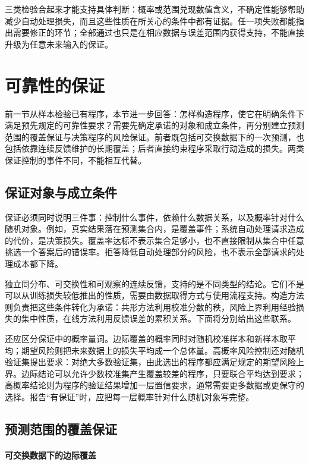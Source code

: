 三类检验合起来才能支持具体判断：概率或范围兑现数值含义，不确定性能够帮助减少自动处理损失，而且这些性质在所关心的条件中都有证据。任一项失败都能指出需要修正的环节；全部通过也只是在相应数据与误差范围内获得支持，不能直接升级为任意未来输入的保证。

\section{可靠性的保证}
\label{sec:reliability-guarantee}

前一节从样本检验已有程序，本节进一步回答：怎样构造程序，使它在明确条件下满足预先规定的可靠性要求？需要先确定承诺的对象和成立条件，再分别建立预测范围的覆盖保证与决策程序的风险保证。前者既包括可交换数据下的一次预测，也包括依靠连续反馈维护的长期覆盖；后者直接约束程序采取行动造成的损失。两类保证控制的事件不同，不能相互代替。

\subsection{保证对象与成立条件}

保证必须同时说明三件事：控制什么事件，依赖什么数据关系，以及概率针对什么随机对象。例如，真实结果落在预测集合内，是覆盖事件；系统自动处理请求造成的代价，是决策损失。覆盖率达标不表示集合足够小，也不直接限制从集合中任意挑选一个答案后的错误率。拒答降低自动处理部分的风险，也不表示全部请求的处理成本都下降。

独立同分布、可交换性和可观察的连续反馈，支持的是不同类型的结论。它们不是可以从训练损失较低推出的性质，需要由数据取得方式与使用流程支持。构造方法则负责把这些条件转化为承诺：共形方法利用校准分数的秩，风险上界利用经验损失的集中性质，在线方法利用反馈误差的累积关系。下面将分别给出这些联系。

还应区分保证中的概率量词。边际覆盖的概率同时对随机校准样本和新样本取平均；期望风险则把未来数据上的损失平均成一个总体量。高概率风险控制还对随机验证集提出要求：对绝大多数验证集，由此选出的程序都应满足规定的期望风险上界。边际结论可以允许少数校准集产生覆盖较差的程序，只要联合平均达到要求；高概率结论则为程序的验证结果增加一层置信要求，通常需要更多数据或更保守的选择。报告“有保证”时，应把每一层概率针对什么随机对象写完整。

\subsection{预测范围的覆盖保证}

\paragraph{可交换数据下的边际覆盖}


